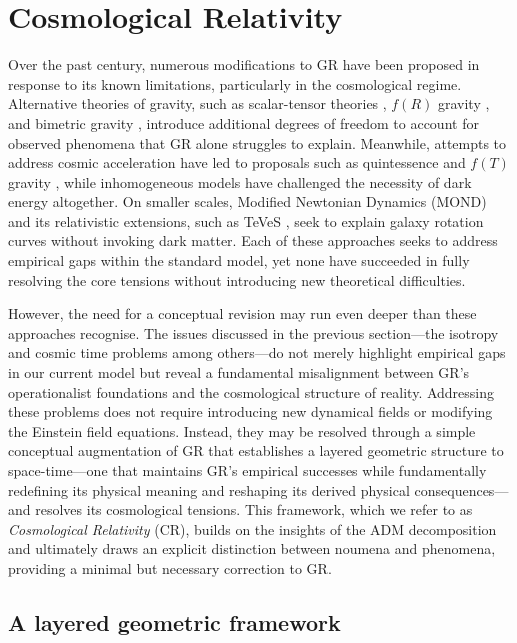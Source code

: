 \documentclass[aps,prd,reprint,superscriptaddress]{revtex4-2}
\begin{document}
\section{Cosmological Relativity}

Over the past century, numerous modifications to GR have been proposed in response to its known limitations, particularly in the cosmological regime. Alternative theories of gravity, such as scalar-tensor theories \cite{Brans1961}, $f(R)$ gravity \cite{Sotiriou2010}, and bimetric gravity \cite{Hassan2012}, introduce additional degrees of freedom to account for observed phenomena that GR alone struggles to explain. Meanwhile, attempts to address cosmic acceleration have led to proposals such as quintessence \cite{Ratra1988} and $f(T)$ gravity \cite{Cai2016}, while inhomogeneous models \cite{Buchert2000, Wiltshire2009, Seifert2025} have challenged the necessity of dark energy altogether. On smaller scales, Modified Newtonian Dynamics (MOND) \cite{Milgrom1983} and its relativistic extensions, such as TeVeS \cite{Bekenstein2004}, seek to explain galaxy rotation curves without invoking dark matter. Each of these approaches seeks to address empirical gaps within the standard model, yet none have succeeded in fully resolving the core tensions without introducing new theoretical difficulties.

However, the need for a conceptual revision may run even deeper than these approaches recognise. The issues discussed in the previous section---the isotropy and cosmic time problems among others---do not merely highlight empirical gaps in our current model but reveal a fundamental misalignment between GR's operationalist foundations and the cosmological structure of reality. Addressing these problems does not require introducing new dynamical fields or modifying the Einstein field equations. Instead, they may be resolved through a simple conceptual augmentation of GR that establishes a layered geometric structure to space-time---one that maintains GR's empirical successes while fundamentally redefining its physical meaning and reshaping its derived physical consequences---and resolves its cosmological tensions. This framework, which we refer to as \textit{Cosmological Relativity} (CR), builds on the insights of the ADM decomposition and ultimately draws an explicit distinction between noumena and phenomena, providing a minimal but necessary correction to GR.

\subsection{A layered geometric framework}
\end{document}

